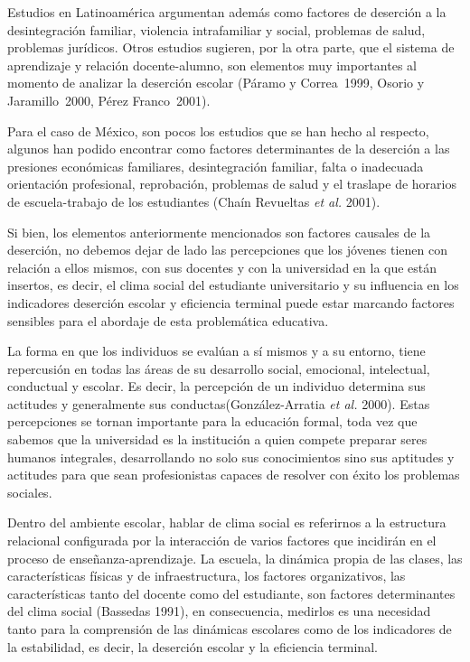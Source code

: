  
Estudios en Latinoamérica argumentan además como factores de deserción a la
desintegración familiar, violencia intrafamiliar y social, problemas de
salud, problemas jurídicos. Otros estudios sugieren, por la otra parte, que
el sistema de aprendizaje y relación docente-alumno, son elementos muy
importantes al momento de analizar la deserción escolar (Páramo y Correa~1999, 
Osorio y Jaramillo~2000, Pérez Franco~2001).

 
Para el caso de México, son pocos los estudios que se han hecho al respecto,
algunos han podido encontrar como factores determinantes de la deserción a
las  presiones económicas familiares, desintegración familiar, falta o
inadecuada orientación profesional, reprobación, problemas de salud y el
traslape de horarios de escuela-trabajo de los estudiantes (Chaín Revueltas
\textit{et al.} 2001).

 
Si bien, los elementos anteriormente mencionados son factores causales de la
deserción, no debemos dejar de lado las percepciones que los jóvenes tienen
con relación a ellos mismos, con sus docentes y con la universidad en la
que están insertos, es decir, el clima social del estudiante universitario
y su influencia en los indicadores deserción escolar y eficiencia terminal
puede estar marcando factores sensibles para el abordaje de esta
problemática educativa.

 
La forma en que los individuos se evalúan a sí mismos y a su entorno, tiene
repercusión en todas las áreas de su desarrollo social, emocional,
intelectual, conductual y escolar. Es decir, la percepción de un individuo
determina sus actitudes y generalmente sus conductas\linebreak (González-Arratia \textit{et
al.} 2000). Estas percepciones se tornan importante para la educación
formal, toda vez que sabemos que la universidad es la institución a quien
compete preparar seres humanos integrales, desarrollando no solo sus
conocimientos sino sus aptitudes y actitudes para que sean profesionistas
capaces de resolver con éxito los problemas sociales.

 
Dentro del ambiente escolar, hablar de clima social es referirnos a la
estructura relacional configurada por la interacción de varios factores que
incidirán en el proceso de enseñanza-aprendizaje. La escuela, la dinámica
propia de las clases, las características físicas y de infraestructura, los
factores organizativos, las características tanto del docente como del
estudiante, son factores determinantes del clima social (Bassedas 1991),
en consecuencia, medirlos es una necesidad tanto para la comprensión de las
dinámicas escolares como de los indicadores de la estabilidad, es decir, la
deserción escolar y la eficiencia terminal.

